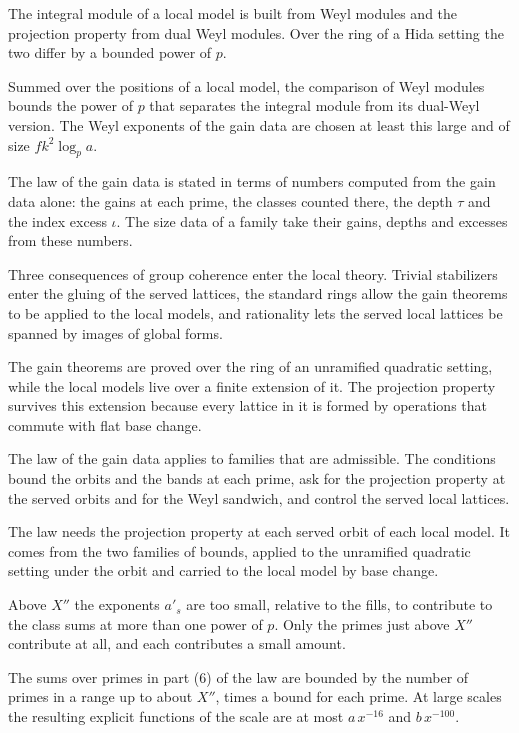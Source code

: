 The integral module of a local model is built from Weyl modules and the projection property from
dual Weyl modules. Over the ring of a Hida setting the two differ by a bounded power of $p$.

Summed over the positions of a local model, the comparison of Weyl modules bounds the power of $p$
that separates the integral module from its dual-Weyl version. The Weyl exponents of the gain data
are chosen at least this large and of size $fk^2\log_pa$.

The law of the gain data is stated in terms of numbers computed from the gain data alone: the gains
at each prime, the classes counted there, the depth $\tau$ and the index excess $\iota$. The size data
of a family take their gains, depths and excesses from these numbers.

Three consequences of group coherence enter the local theory. Trivial stabilizers enter the gluing
of the served lattices, the standard rings allow the gain theorems to be applied to the local models,
and rationality lets the served local lattices be spanned by images of global forms.

The gain theorems are proved over the ring of an unramified quadratic setting, while the local
models live over a finite extension of it. The projection property survives this extension because
every lattice in it is formed by operations that commute with flat base change.

The law of the gain data applies to families that are admissible. The conditions bound the orbits
and the bands at each prime, ask for the projection property at the served orbits and for the Weyl
sandwich, and control the served local lattices.

The law needs the projection property at each served orbit of each local model. It comes from the
two families of bounds, applied to the unramified quadratic setting under the orbit and carried to
the local model by base change.

Above $X''$ the exponents $a'_s$ are too small, relative to the fills, to contribute to the class
sums at more than one power of $p$. Only the primes just above $X''$ contribute at all, and each
contributes a small amount.

The sums over primes in part (6) of the law are bounded by the number of primes in a range up to
about $X''$, times a bound for each prime. At large scales the resulting explicit functions of the
scale are at most $a\,x^{-16}$ and $b\,x^{-100}$.

